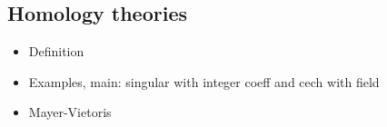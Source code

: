 
\subsection{Homology theories}

\begin{itemize}
	\item Definition
	\item Examples, main: singular with integer coeff and cech with field 
	\item Mayer-Vietoris
\end{itemize}